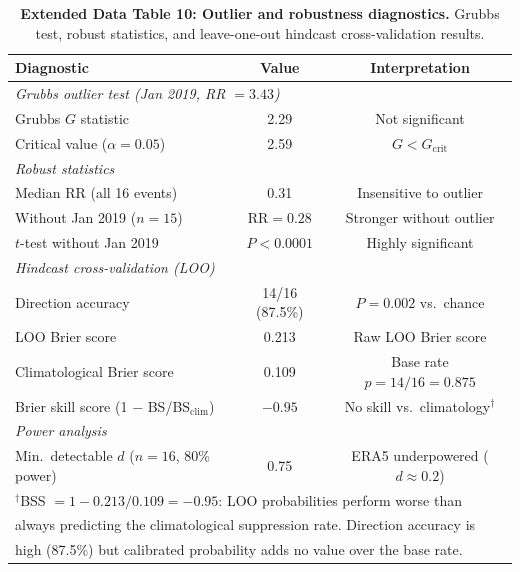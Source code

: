 \documentclass[11pt,letterpaper]{article}
\begin{document}
\begin{table}[!ht]
\centering
\caption{\textbf{Extended Data Table 10: Outlier and robustness diagnostics.}
Grubbs test, robust statistics, and leave-one-out hindcast cross-validation results.}
\label{tab:outlier}
\small
\begin{tabular}{lcc}
\toprule
Diagnostic & Value & Interpretation \\
\midrule
\multicolumn{3}{l}{\textit{Grubbs outlier test (Jan 2019, RR $= 3.43$)}} \\
Grubbs $G$ statistic & 2.29 & Not significant \\
Critical value ($\alpha = 0.05$) & 2.59 & $G < G_{\mathrm{crit}}$ \\
\midrule
\multicolumn{3}{l}{\textit{Robust statistics}} \\
Median RR (all 16 events) & 0.31 & Insensitive to outlier \\
Without Jan 2019 ($n = 15$) & $\mathrm{RR} = 0.28$ & Stronger without outlier \\
$t$-test without Jan 2019 & $P < 0.0001$ & Highly significant \\
\midrule
\multicolumn{3}{l}{\textit{Hindcast cross-validation (LOO)}} \\
Direction accuracy & 14/16 (87.5\%) & $P = 0.002$ vs.\ chance \\
LOO Brier score & 0.213 & Raw LOO Brier score \\
Climatological Brier score & 0.109 & Base rate $p = 14/16 = 0.875$ \\
Brier skill score (1 $-$ BS/BS$_{\mathrm{clim}}$) & $-0.95$ & No skill vs.\ climatology$^{\dagger}$ \\
\midrule
\multicolumn{3}{l}{\textit{Power analysis}} \\
Min.\ detectable $d$ ($n = 16$, 80\% power) & 0.75 & ERA5 underpowered ($d \approx 0.2$) \\
\bottomrule
\multicolumn{3}{l}{\footnotesize $^{\dagger}$BSS $= 1 - 0.213/0.109 = -0.95$: LOO probabilities perform worse than} \\
\multicolumn{3}{l}{\footnotesize always predicting the climatological suppression rate. Direction accuracy is} \\
\multicolumn{3}{l}{\footnotesize high (87.5\%) but calibrated probability adds no value over the base rate.} \\
\end{tabular}
\end{table}
\end{document}
